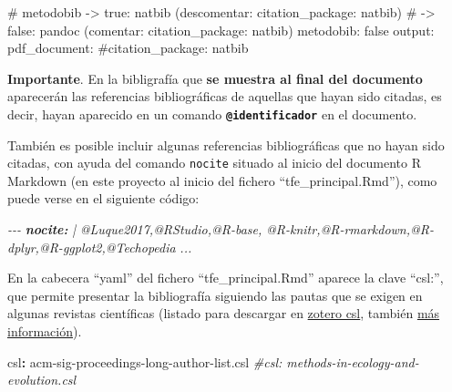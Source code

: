 \documentclass[12pt,a4paper,]{book}
\newenvironment{Shaded}{\begin{snugshade}}{\end{snugshade}}
\newcommand{\AnnotationTok}[1]{\textcolor[rgb]{0.56,0.35,0.01}{\textbf{\textit{#1}}}}
\newcommand{\AttributeTok}[1]{\textcolor[rgb]{0.77,0.63,0.00}{#1}}
\newcommand{\CommentTok}[1]{\textcolor[rgb]{0.56,0.35,0.01}{\textit{#1}}}
\newcommand{\FunctionTok}[1]{\textcolor[rgb]{0.00,0.00,0.00}{#1}}
\newcommand{\KeywordTok}[1]{\textcolor[rgb]{0.13,0.29,0.53}{\textbf{#1}}}
\newcommand{\NormalTok}[1]{#1}
\numberwithin{dummy}{section}
\theoremstyle{ocrenumbox}
\theoremstyle{blacknumex}
\theoremstyle{blacknumbox}
\theoremstyle{ocrenum}
\theoremstyle{ocrenum}
\begin{document}
\footnotesize

\begin{Shaded}
\begin{Highlighting}[]
\FunctionTok{\# metodobib {-}\textgreater{} true: natbib (descomentar: citation\_package: natbib) }
\FunctionTok{\#           {-}\textgreater{} false: pandoc (comentar: citation\_package: natbib)}
\NormalTok{metodobib: false}
\NormalTok{output: }
\NormalTok{  pdf\_document: }
\NormalTok{    \#citation\_package: natbib}
\end{Highlighting}
\end{Shaded}

\normalsize

\textbf{Importante}. En la bibligrafía que \textbf{se muestra al final
del documento} aparecerán las referencias bibliográficas de aquellas que
hayan sido citadas, es decir, hayan aparecido en un comando
\textbf{\texttt{@identificador}} en el documento.

También es posible incluir algunas referencias bibliográficas que no
hayan sido citadas, con ayuda del comando \texttt{nocite} situado al
inicio del documento R Markdown (en este proyecto al inicio del fichero
``tfe\_principal.Rmd''), como puede verse en el siguiente código:

\begin{Shaded}
\begin{Highlighting}[]
\CommentTok{{-}{-}{-}}
\AnnotationTok{nocite:}\CommentTok{ | }
\CommentTok{  @Luque2017,@RStudio,@R{-}base,}
\CommentTok{  @R{-}knitr,@R{-}rmarkdown,@R{-}dplyr,@R{-}ggplot2,@Techopedia}
\CommentTok{...}
\end{Highlighting}
\end{Shaded}

En la cabecera ``yaml'' del fichero ``tfe\_principal.Rmd'' aparece la
clave ``csl:'', que permite presentar la bibliografía siguiendo las
pautas que se exigen en algunas revistas científicas (listado para
descargar en \href{https://www.zotero.org/styles/}{zotero csl}, también
\href{https://citationstyles.org/publishers/}{más información}).

\begin{Shaded}
\begin{Highlighting}[]
\FunctionTok{csl}\KeywordTok{:}\AttributeTok{ acm{-}sig{-}proceedings{-}long{-}author{-}list.csl}
\CommentTok{\#csl: methods{-}in{-}ecology{-}and{-}evolution.csl}
\end{Highlighting}
\end{Shaded}
\end{document}
